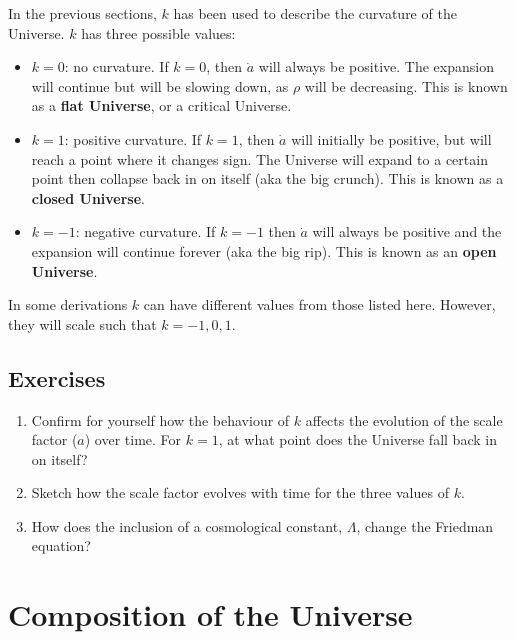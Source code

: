 \documentclass[11pt,a4paper]{book}
\begin{document}
In the previous sections, \(k\) has been used to describe the curvature of
the Universe. \(k\) has three possible values:

\begin{itemize}
\item
  \(k = 0\): no curvature. If \(k=0\), then \(\dot{a}\) will always be
  positive. The expansion will continue but will be slowing down, as
  \(\rho\) will be decreasing. This is known as a \textbf{flat Universe}, or
  a critical Universe.
\item
  \(k = 1\): positive curvature. If \(k = 1\), then \(\dot{a}\) will
  initially be positive, but will reach a point where it changes sign.
  The Universe will expand to a certain point then collapse back in on
  itself (aka the big crunch). This is known as a \textbf{closed Universe}.
\item
  \(k = -1\): negative curvature. If \(k=-1\) then \(\dot{a}\) will always
  be positive and the expansion will continue forever (aka the big
  rip). This is known as an \textbf{open Universe}.
\end{itemize}

In some derivations \(k\) can have different values from those
listed here. However, they will scale such that \(k = -1, 0, 1\).

\hypertarget{sec:geometry-ex}{%
\section{Exercises}\label{sec:geometry-ex}}

\begin{enumerate}
\def\labelenumi{\arabic{enumi}.}
\item
  Confirm for yourself how the behaviour of \(k\) affects the evolution
  of the scale factor (\(a\)) over time. For \(k=1\), at what point does
  the Universe fall back in on itself?
\item
  Sketch how the scale factor evolves with time for the three values
  of \(k\).
\item
  How does the inclusion of a cosmological constant, \(\Lambda\), change
  the Friedman equation?
\end{enumerate}

\hypertarget{ch:constituents}{%
\chapter{Composition of the Universe}\label{ch:constituents}}
\end{document}
